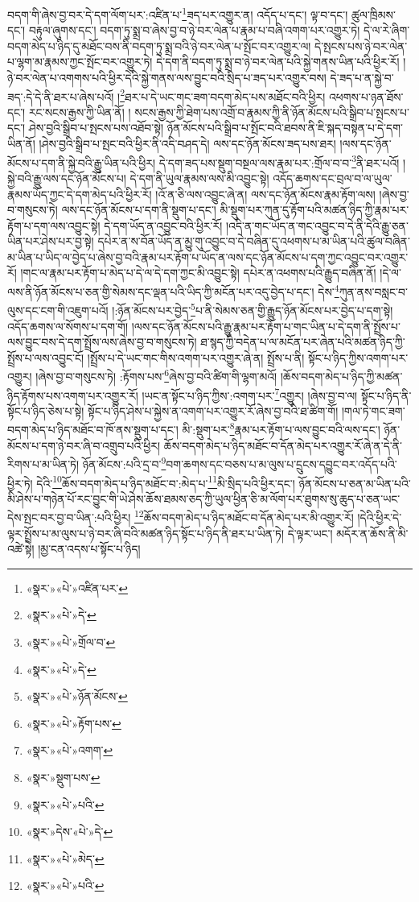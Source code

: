 བདག་གི་ཞེས་བྱ་བར་དེ་དག་ལོག་པར་:འཛིན་པ་\footnote{«སྣར་»«པེ་»འཛིན་པར་}ཟད་པར་འགྱུར་ན། འདོད་པ་དང་། ལྟ་བ་དང་། ཚུལ་ཁྲིམས་དང་། བརྟུལ་ཞུགས་དང་། བདག་ཏུ་སྨྲ་བ་ཞེས་བྱ་བ་ཉེ་བར་ལེན་པ་རྣམ་པ་བཞི་འགག་པར་འགྱུར་ཏེ། དེ་ལ་རེ་ཞིག་བདག་མེད་པ་ཉིད་དུ་མཐོང་བས་ནི་བདག་ཏུ་སྨྲ་བའི་ཉེ་བར་ལེན་པ་སྤོང་བར་འགྱུར་ལ། དེ་སྤངས་པས་ཉེ་བར་ལེན་པ་ལྷག་མ་རྣམས་ཀྱང་སྤོང་བར་འགྱུར་ཏེ། དེ་དག་ནི་བདག་ཏུ་སྨྲ་བ་ཉེ་བར་ལེན་པའི་སྐྱེ་གནས་ཡིན་པའི་ཕྱིར་རོ། །ཉེ་བར་ལེན་པ་འགགས་པའི་ཕྱིར་དེའི་སྐྱེ་གནས་ལས་བྱུང་བའི་སྲིད་པ་ཟད་པར་འགྱུར་བས། དེ་ཟད་པ་ན་སྐྱེ་བ་ཟད་:དེ་དེ་ནི་ཐར་པ་ཞེས་པའོ། །\footnote{«སྣར་»«པེ་»དེ་}ཐར་པ་དེ་ཡང་གང་ཟག་བདག་མེད་པས་མཐོང་བའི་ཕྱིར། འཕགས་པ་ཉན་ཐོས་དང་། རང་སངས་རྒྱས་ཀྱི་ཡིན་ནོ། །
སངས་རྒྱས་ཀྱི་ཐེག་པས་འགྲོ་བ་རྣམས་ཀྱི་ནི་ཉོན་མོངས་པའི་སྒྲིབ་པ་སྤངས་པ་དང་། ཤེས་བྱའི་སྒྲིབ་པ་སྤངས་པས་འཐོབ་སྟེ། ཉོན་མོངས་པའི་སྒྲིབ་པ་སྤོང་བའི་ཐབས་ནི་ཇི་སྐད་བསྟན་པ་དེ་དག་ཡིན་ནོ། །ཤེས་བྱའི་སྒྲིབ་པ་སྤང་བའི་ཕྱིར་ནི་འདི་བཤད་དེ། ལས་དང་ཉོན་མོངས་ཟད་པས་ཐར། །ལས་དང་ཉོན་མོངས་པ་དག་ནི་སྐྱེ་བའི་རྒྱུ་ཡིན་པའི་ཕྱིར། དེ་དག་ཟད་པས་སྡུག་བསྔལ་ལས་རྣམ་པར་:གྲོལ་བ་བ་\footnote{«སྣར་»«པེ་»གྲོལ་བ་}ནི་ཐར་པའོ། །སྐྱེ་བའི་རྒྱུ་ལས་དང་ཉོན་མོངས་པ། དེ་དག་ནི་ཡུལ་རྣམས་ལས་མི་འབྱུང་སྟེ། འདོད་ཆགས་དང་བྲལ་བ་ལ་ཡུལ་རྣམས་ཡོད་ཀྱང་དེ་དག་མེད་པའི་ཕྱིར་རོ། །འོ་ན་ཅི་ལས་འབྱུང་ཞེ་ན། ལས་དང་ཉོན་མོངས་རྣམ་རྟོག་ལས། །ཞེས་བྱ་བ་གསུངས་ཏེ། ལས་དང་ཉོན་མོངས་པ་དག་ནི་སྡུག་པ་དང་། མི་སྡུག་པར་ཀུན་དུ་རྟོག་པའི་མཚན་ཉིད་ཀྱི་རྣམ་པར་རྟོག་པ་དག་ལས་འབྱུང་སྟེ། དེ་དག་ཡོད་ན་འབྱུང་བའི་ཕྱིར་རོ། །འདི་ན་གང་ཡོད་ན་གང་འབྱུང་བ་དེ་ནི་དེའི་རྒྱུ་ཅན་ཡིན་པར་ཤེས་པར་བྱ་སྟེ། དཔེར་ན་ས་བོན་ཡོད་ན་མྱུ་གུ་འབྱུང་བ་དེ་བཞིན་དུ་འཕགས་པ་མ་ཡིན་པའི་ཚུལ་བཞིན་མ་ཡིན་པ་ཡིད་ལ་བྱེད་པ་ཞེས་བྱ་བའི་རྣམ་པར་རྟོག་པ་ཡོད་ན་ལས་དང་ཉོན་མོངས་པ་དག་ཀྱང་འབྱུང་བར་འགྱུར་རོ། །གང་ལ་རྣམ་པར་རྟོག་པ་མེད་པ་དེ་ལ་དེ་དག་ཀྱང་མི་འབྱུང་སྟེ། དཔེར་ན་འཕགས་པའི་རྒྱུད་བཞིན་ནོ། །དེ་ལ་ལས་ནི་ཉོན་མོངས་པ་ཅན་གྱི་སེམས་དང་ལྡན་པའི་ཡིད་ཀྱི་མངོན་པར་འདུ་བྱེད་པ་དང་། དེས་\footnote{«སྣར་»«པེ་»དེ་}ཀུན་ནས་བསླང་བ་ལུས་དང་ངག་གི་འཇུག་པའོ། །:ཉོན་མོངས་པར་བྱེད་\footnote{«སྣར་»«པེ་»ཉོན་མོངས་}པ་ནི་སེམས་ཅན་གྱི་རྒྱུད་ཉོན་མོངས་པར་བྱེད་པ་དག་སྟེ། འདོད་ཆགས་ལ་སོགས་པ་དག་གོ། །ལས་དང་ཉོན་མོངས་པའི་རྒྱུ་རྣམ་པར་རྟོག་པ་གང་ཡིན་པ་དེ་དག་ནི་སྤྲོས་པ་ལས་བྱུང་བས་དེ་དག་སྤྲོས་ལས་ཞེས་བྱ་བ་གསུངས་ཏེ། ཐ་སྙད་ཀྱི་བདེན་པ་ལ་མངོན་པར་ཞེན་པའི་མཚན་ཉིད་ཀྱི་སྤྲོས་པ་ལས་འབྱུང་ངོ། །སྤྲོས་པ་དེ་ཡང་གང་གིས་འགག་པར་འགྱུར་ཞེ་ན། སྤྲོས་པ་ནི། སྟོང་པ་ཉིད་ཀྱིས་འགག་པར་འགྱུར། །ཞེས་བྱ་བ་གསུངས་ཏེ། :རྟོགས་པས་\footnote{«སྣར་»«པེ་»རྟོག་པས་}ཞེས་བྱ་བའི་ཚིག་གི་ལྷག་མའོ། །ཆོས་བདག་མེད་པ་ཉིད་ཀྱི་མཚན་ཉིད་རྟོགས་པས་འགག་པར་འགྱུར་རོ། །ཡང་ན་སྟོང་པ་ཉིད་ཀྱིས་:འགག་པར་\footnote{«སྣར་»«པེ་»འགག་}འགྱུར། །ཞེས་བྱ་བ་ལ། སྟོང་པ་ཉིད་ནི་སྟོང་པ་ཉིད་ཅེས་པ་སྟེ། སྟོང་པ་ཉིད་ཤེས་པ་སྐྱེས་ན་འགག་པར་འགྱུར་རོ་ཞེས་བྱ་བའི་ཐ་ཚིག་གོ། །གལ་ཏེ་གང་ཟག་བདག་མེད་པ་ཉིད་མཐོང་བ་ཁོ་ནས་སྡུག་པ་དང་། མི་:སྡུག་པར་\footnote{«སྣར་»སྡུག་པས་}རྣམ་པར་རྟོག་པ་ལས་བྱུང་བའི་ལས་དང་། ཉོན་མོངས་པ་དག་ཉེ་བར་ཞི་བ་འགྲུབ་པའི་ཕྱིར། ཆོས་བདག་མེད་པ་ཉིད་མཐོང་བ་དོན་མེད་པར་འགྱུར་རོ་ཞེ་ན་དེ་ནི་རིགས་པ་མ་ཡིན་ཏེ། ཉོན་མོངས་:པའི་དྲ་བ་\footnote{«སྣར་»«པེ་»པའི་}བག་ཆགས་དང་བཅས་པ་མ་ལུས་པ་དྲུངས་དབྱུང་བར་འདོད་པའི་ཕྱིར་ཏེ། དེའི་\footnote{«སྣར་»དེས་«པེ་»དེ་}ཆོས་བདག་མེད་པ་ཉིད་མཐོང་བ་:མེད་པ་\footnote{«སྣར་»«པེ་»མེད་}མི་སྲིད་པའི་ཕྱིར་དང་། ཉོན་མོངས་པ་ཅན་མ་ཡིན་པའི་མི་ཤེས་པ་གཉེན་པོ་རང་བྱུང་གི་ཡེ་ཤེས་ཆོས་ཐམས་ཅད་ཀྱི་ཡུལ་ཕྱིན་ཅི་མ་ལོག་པར་ཐུགས་སུ་ཆུད་པ་ཅན་ཡང་དེས་སྤང་བར་བྱ་བ་ཡིན་:པའི་ཕྱིར། \footnote{«སྣར་»«པེ་»པའི་}ཆོས་བདག་མེད་པ་ཉིད་མཐོང་བ་དོན་མེད་པར་མི་འགྱུར་རོ། །དེའི་ཕྱིར་དེ་ལྟར་སྤྲོས་པ་མ་ལུས་པ་ཉེ་བར་ཞི་བའི་མཚན་ཉིད་སྟོང་པ་ཉིད་ནི་ཐར་པ་ཡིན་ཏེ། དེ་ལྟར་ཡང་། མདོར་ན་ཆོས་ནི་མི་འཚེ་སྟེ། །མྱ་ངན་འདས་པ་སྟོང་པ་ཉིད། 